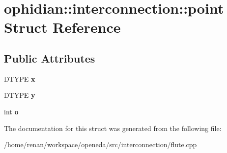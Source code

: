 \hypertarget{structophidian_1_1interconnection_1_1point}{\section{ophidian\-:\-:interconnection\-:\-:point Struct Reference}
\label{structophidian_1_1interconnection_1_1point}
}
\subsection*{Public Attributes}
\begin{DoxyCompactItemize}
\item 
\hypertarget{structophidian_1_1interconnection_1_1point_a21d0b15f65a9e4b5f34665eff536d640}{D\-T\-Y\-P\-E {\bfseries x}}\label{structophidian_1_1interconnection_1_1point_a21d0b15f65a9e4b5f34665eff536d640}

\item 
\hypertarget{structophidian_1_1interconnection_1_1point_a57f34fc010b4b15747ee1d5c9ec39bfd}{D\-T\-Y\-P\-E {\bfseries y}}\label{structophidian_1_1interconnection_1_1point_a57f34fc010b4b15747ee1d5c9ec39bfd}

\item 
\hypertarget{structophidian_1_1interconnection_1_1point_aba3dc127fcb0812fdb1e99885f5857a9}{int {\bfseries o}}\label{structophidian_1_1interconnection_1_1point_aba3dc127fcb0812fdb1e99885f5857a9}

\end{DoxyCompactItemize}


The documentation for this struct was generated from the following file\-:\begin{DoxyCompactItemize}
\item 
/home/renan/workspace/openeda/src/interconnection/flute.\-cpp\end{DoxyCompactItemize}
